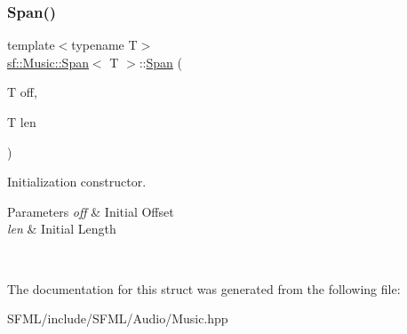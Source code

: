 \subsubsection{\texorpdfstring{Span()}{Span()}\hspace{0.1cm}{\footnotesize\ttfamily [2/2]}}
{\footnotesize\ttfamily template$<$typename T$>$ \\
\mbox{\hyperlink{structsf_1_1_music_1_1_span}{sf\+::\+Music\+::\+Span}}$<$ T $>$\+::\mbox{\hyperlink{structsf_1_1_music_1_1_span}{Span}} (\begin{DoxyParamCaption}\item[{T}]{off,  }\item[{T}]{len }\end{DoxyParamCaption})\hspace{0.3cm}{\ttfamily [inline]}}



Initialization constructor. 


\begin{DoxyParams}{Parameters}
{\em off} & Initial Offset \\
\hline
{\em len} & Initial Length \begin{DoxyVerb}\end{DoxyVerb}
 \\
\hline
\end{DoxyParams}


The documentation for this struct was generated from the following file\+:\begin{DoxyCompactItemize}
\item 
S\+F\+M\+L/include/\+S\+F\+M\+L/\+Audio/Music.\+hpp\end{DoxyCompactItemize}

